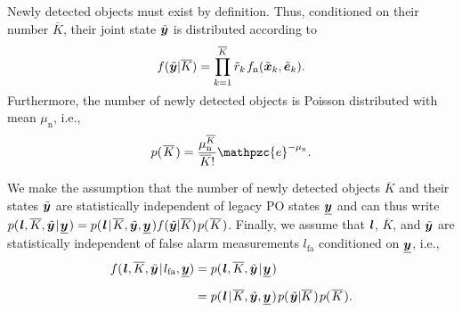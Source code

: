 \documentclass[11pt,a4paper]{article}
\newcommand{\ist}{\hspace*{.3mm}}
\newcommand{\nn}{\nonumber}
\newcommand{\Knew}{\overline{K}}
\newcommand{\yt}{\tilde{\V{y}}}
\newcommand{\xt}{\tilde{\V{x}}}
\newcommand{\et}{\tilde{\V{e}}}
\newcommand{\rt}{\tilde{r}}
\begin{document}
\begin{enumerate}
Newly detected objects must exist by definition. Thus, conditioned on their number $\overline{K}$, their joint state $\tilde{\bm{y}}$ is distributed according \vspace{-4.5mm} to
\begin{align}
f(\yt | \Knew)  &=  \prod_{k=1}^{\Knew} \rt_k \ist f_{\mathrm{n}}(\xt_k, \et_k). \label{eq:priorNewPOs} \\[-8mm]
\nn
\end{align}

Furthermore, the number of newly detected objects is Poisson distributed with mean $\mu_{\mathrm{n}}$, i.e., 
\begin{equation}
p ( \ist \overline{K} \ist )= \frac{\mu^{\overline{K}}_{\mathrm{n}}}{\overline{K}!} \mathpzc{e}^{-\mu_{\mathrm{n}}}.
 \label{eq:priorK}
\end{equation}

We make the assumption \cite{MeyKroWilLauHlaBraWin:J18,GraFatSve:J19} that the number of newly detected objects $\overline{K}$ and their states $\yt$ are statistically independent of 
legacy PO states $\underline{\bm{y}}$ and can thus \vspace{0mm} write $p( \ist \V{l}, \overline{K}, \tilde{\V{y}} \ist | \ist  \underline{\V{y}} \ist) = p( \ist \V{l} \ist | \ist \overline{K}, \tilde{\V{y}}, \underline{\V{y}} \ist) f(\yt | \Knew)  \ist p ( \ist \overline{K} \ist )$. Finally, we assume \cite{MeyKroWilLauHlaBraWin:J18,GraFatSve:J19} that $\bm{l}$, $\overline{K}$, and $\tilde{\bm{y}}$ are statistically independent of false alarm measurements $l_{\mathrm{fa}}$ conditioned on $\underline{\bm{y}}$, i.e.\vspace{-4mm},
\begin{align}
f( \ist \V{l}, \overline{K}, \tilde{\V{y}}  \ist | \ist l_{\mathrm{fa}}, \underline{\V{y}} )  &=p( \ist \V{l}, \overline{K}, \tilde{\V{y}} \ist | \ist  \underline{\V{y}} \ist) \nn\\[2mm]
&= p( \ist \V{l} \ist | \ist \overline{K}, \tilde{\V{y}},  \underline{\V{y}}\ist)\ist p(\ist \tilde{\V{y}} |  \overline{K} \ist) \ist p( \ist \overline{K} \ist). 
\label{eq:condPDF4b} \\[-7mm]
\nn
\end{align}



\end{enumerate}
\end{document}

